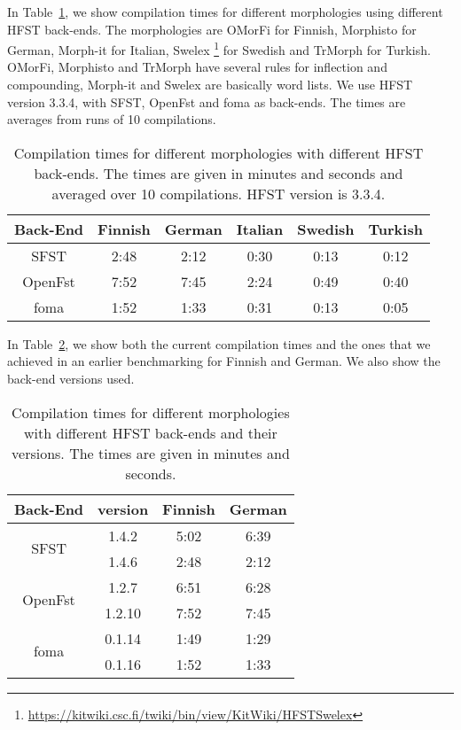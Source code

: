 \documentclass{llncs}
\begin{document}
In Table~\ref{tab:compilation_times}, we show compilation times for different 
morphologies using different HFST back-ends. The morphologies are OMorFi 
\cite{pirinen/2008} for Finnish, Morphisto \cite{zielinski/2009} for German,
Morph-it \cite{Zanchetta/2005} for Italian, Swelex 
\footnote{\url{https://kitwiki.csc.fi/twiki/bin/view/KitWiki/HFSTSwelex}} 
for Swedish and TrMorph \cite{Coltekin/2010} for Turkish. 
OMorFi, Morphisto and TrMorph have several rules for
inflection and compounding, Morph-it and Swelex are basically word lists.
We use HFST version 3.3.4, with SFST, OpenFst and foma as
back-ends. The times are averages from runs of 10 compilations.

\begin{table} [h!]
  \centering
  \caption{Compilation times for different morphologies with
    different HFST back-ends. The times are given in minutes and seconds
    and averaged over 10 compilations. HFST version is 3.3.4.}
  \begin{tabular}{c c c c c c }
    \hline
    Back-End & Finnish & German & Italian & Swedish & Turkish \\ \hline
    SFST & 2:48 & 2:12 & 0:30 & 0:13 & 0:12 \\
    OpenFst & 7:52 & 7:45 & 2:24 & 0:49 & 0:40 \\
    foma & 1:52 & 1:33 & 0:31 & 0:13 & 0:05 \\ \hline
  \end{tabular}
  \label{tab:compilation_times}
\end{table}


In Table~\ref{tab:compilation_times_versions}, we show both the current compilation 
times and the ones that we achieved in an earlier benchmarking \cite{linden/2011/sfcm} for 
Finnish and German. We also show the back-end versions used.

\begin{table} [h!]
  \centering
  \caption{Compilation times for different morphologies with
    different HFST back-ends and their versions. 
    The times are given in minutes and seconds.}
  \begin{tabular}{ c c c c }
    \hline
    Back-End                 & version  & Finnish  & German \\ \hline
    \multirow{2}{*}{SFST}    & 1.4.2    & 5:02     & 6:39 \\
    & 1.4.6    & 2:48     & 2:12 \\
    \multirow{2}{*}{OpenFst} & 1.2.7    & 6:51     & 6:28 \\
    & 1.2.10   & 7:52     & 7:45 \\
    \multirow{2}{*}{foma}    & 0.1.14   & 1:49     & 1:29 \\
    & 0.1.16   & 1:52     & 1:33 \\
    \hline
  \end{tabular}
  \label{tab:compilation_times_versions}
\end{table}
\end{document}
